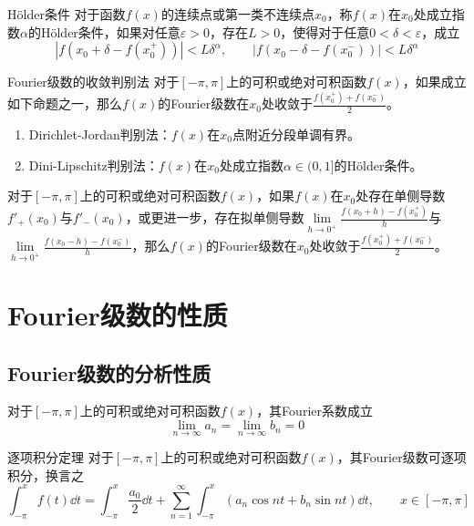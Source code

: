 \documentclass[lang = cn, scheme = chinese, thmcnt = section]{elegantbook}
\begin{document}
\begin{definition}{Hölder条件}
	对于函数$f(x)$的连续点或第一类不连续点$x_0$，称$f(x)$在$x_0$处成立指数$\alpha$的Hölder条件，如果对任意$\varepsilon>0$，存在$L>0$，使得对于任意$0<\delta<\varepsilon$，成立
	$$
	|f(x_0+\delta-f(x_0^+))|<L\delta^\alpha,\qquad 
	|f(x_0-\delta-f(x_0^-))|<L\delta^\alpha
	$$
\end{definition}

\begin{theorem}{Fourier级数的收敛判别法}
	对于$[-\pi,\pi]$上的可积或绝对可积函数$f(x)$，如果成立如下命题之一，那么$f(x)$的Fourier级数在$x_0$处收敛于$\frac{f(x_0^+)+f(x_0^-)}{2}$。
	\begin{enumerate}
		\item Dirichlet-Jordan判别法：$f(x)$在$x_0$点附近分段单调有界。
		\item Dini-Lipschitz判别法：$f(x)$在$x_0$处成立指数$\alpha\in (0,1]$的Hölder条件。
	\end{enumerate}
\end{theorem}

\begin{corollary}
	对于$[-\pi,\pi]$上的可积或绝对可积函数$f(x)$，如果$f(x)$在$x_0$处存在单侧导数$f'_+(x_0)$与$f'_-(x_0)$，或更进一步，存在拟单侧导数$\lim\limits_{h\to0^+}\frac{f(x_0+h)-f(x_0^+)}{h}$与$\lim\limits_{h\to0^+}\frac{f(x_0-h)-f(x_0^-)}{h}$，那么$f(x)$的Fourier级数在$x_0$处收敛于$\frac{f(x_0^+)+f(x_0^-)}{2}$。
\end{corollary}

\section{Fourier级数的性质}

\subsection{Fourier级数的分析性质}

\begin{proposition}
	对于$[-\pi,\pi]$上的可积或绝对可积函数$f(x)$，其Fourier系数成立
	$$
	\lim_{n\to\infty}a_n=\lim_{n\to\infty}b_n=0
	$$
\end{proposition}

\begin{theorem}{逐项积分定理}
	对于$[-\pi,\pi]$上的可积或绝对可积函数$f(x)$，其Fourier级数可逐项积分，换言之
	$$
	\int_{-\pi}^{x}f(t)\dd t=
	\int_{-\pi}^{x}\frac{a_0}{2}\dd t+
	\sum_{n=1}^{\infty}\int_{-\pi}^{x}(a_n\cos nt+b_n\sin nt)\dd t,\qquad x\in [-\pi,\pi]
	$$
\end{theorem}
\end{document}
